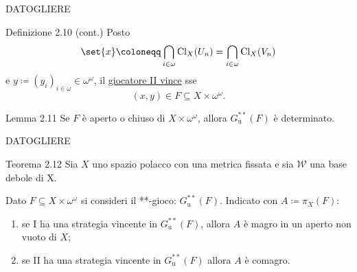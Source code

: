 \documentclass[babel]{beamer}
\renewcommand{\href}[2]{#2}
\begin{document}
\begin{frame}[label={sec:org27e3d89}]{DATOGLIERE}
\begin{block}{Definizione 2.10 (cont.)}
Posto
\begin{equation*}
\set{x}\coloneqq\bigcap_{i \in \omega} \operatorname{Cl}_{X}(U_{n}) = \bigcap_{i \in \omega} \operatorname{Cl}_{X}(V_{n})
\end{equation*}
e \(y\coloneqq (y_{i})_{i \in \omega} \in \omega^{\omega}\), il \uline{giocatore II vince} sse
\begin{equation*}
(x,y) \in F \subseteq X\times \omega^{\omega}.
\end{equation*}
\end{block}
\begin{alertblock}{Lemma 2.11}
Se \(F\) è aperto o chiuso di \(X\times\omega^{\omega}\), allora \(G^{**}_{\text{u}}(F)\) è determinato.
\end{alertblock}
\end{frame}
\begin{frame}[label={sec:orgfeb2e5d}]{DATOGLIERE}
\begin{alertblock}{Teorema 2.12}
Sia \(X\) uno spazio polacco con una metrica fissata e sia \(\mathcal{W}\) una base debole di X.

Dato \(F \subseteq X\times \omega^{\omega}\) si consideri il \href{../../../../../../../org/roam/20250513111844-gioco_di_banach_mazur.org}{**-gioco}: \(G^{**}_{\text{u}}(F)\). Indicato con \(A\coloneqq \pi_{X}(F)\):
\begin{enumerate}
\item se I ha una \href{../../../../../../../org/roam/20250513171520-giochi_di_gale_stewart.org}{strategia} \href{../../../../../../../org/roam/20250513171520-giochi_di_gale_stewart.org}{vincente} in \(G^{**}_{\text{u}}(F)\), allora \(A\) è magro in un aperto non vuoto di \(X\);
\item se II ha una \href{../../../../../../../org/roam/20250513171520-giochi_di_gale_stewart.org}{strategia} \href{../../../../../../../org/roam/20250513171520-giochi_di_gale_stewart.org}{vincente} in \(G^{**}_{\text{u}}(F)\) allora \(A\) è comagro.
\end{enumerate}
\end{alertblock}
\end{frame}
\end{document}
